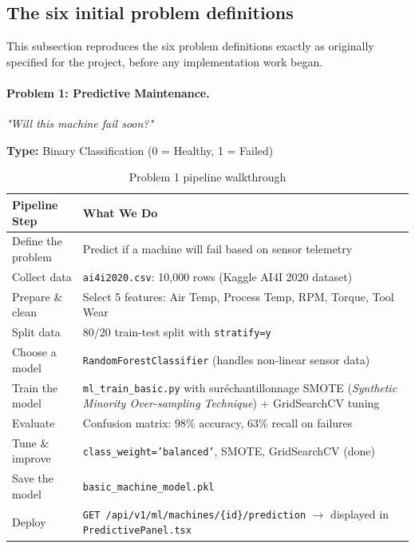 \subsection{The six initial problem definitions}

This subsection reproduces the six problem definitions exactly as originally specified for the project, before any implementation work began.

\paragraph{Problem 1: Predictive Maintenance.}
\emph{"Will this machine fail soon?"}

\textbf{Type:} Binary Classification (0 = Healthy, 1 = Failed)

\begin{table}[h]
\centering
\begin{tabularx}{\textwidth}{|l|X|}
\toprule
\textbf{Pipeline Step} & \textbf{What We Do} \\
\midrule
Define the problem & Predict if a machine will fail based on sensor telemetry \\
\midrule
Collect data & \texttt{ai4i2020.csv}: 10,000 rows (Kaggle AI4I 2020 dataset) \\
\midrule
Prepare \& clean & Select 5 features: Air Temp, Process Temp, RPM, Torque, Tool Wear \\
\midrule
Split data & 80/20 train-test split with \texttt{stratify=y} \\
\midrule
Choose a model & \texttt{RandomForestClassifier} (handles non-linear sensor data) \\
\midrule
Train the model & \texttt{ml\_train\_basic.py} with sur\'{e}chantillonnage SMOTE (\textit{Synthetic Minority Over-sampling Technique}) + GridSearchCV tuning \\
\midrule
Evaluate & Confusion matrix: 98\% accuracy, 63\% recall on failures \\
\midrule
Tune \& improve & \texttt{class\_weight='balanced'}, SMOTE, GridSearchCV (done) \\
\midrule
Save the model & \texttt{basic\_machine\_model.pkl} \\
\midrule
Deploy & \texttt{GET /api/v1/ml/machines/\{id\}/prediction} $\rightarrow$ displayed in \texttt{PredictivePanel.tsx} \\
\bottomrule
\end{tabularx}
\caption{Problem 1 pipeline walkthrough}
\label{tab:p1-walkthrough}
\end{table}

